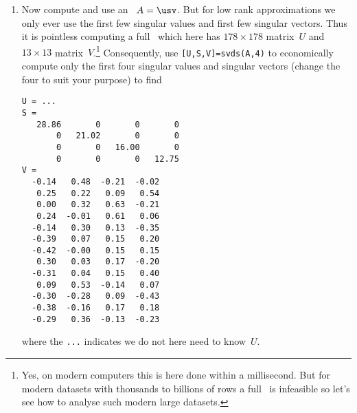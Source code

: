 \begin{example}
\begin{solution}
\begin{enumerate}
But now a further issue arises: the values in the columns are of widely different magnitudes; moreover, each column has different physical units (in contrast, the Iris flower measurements were all cm).
In practice we \emph{must not} mix together quantities with different physical units. 
The general rule, after making each column zero mean, is to scale each column by dividing by its ,  equivalently by its root-mean-square.
This scaling does two practically useful things: 
\begin{itemize}
\item since the standard deviation measures the spread of data in a column, it has the same physical units as the column of data, so dividing by it renders the results dimensionless, and so suitable for mixing with other scaled columns;
\item also the spread of data in each column is now comparable to each other, namely around about size one, instead of some columns being of the order of one-tenths and other columns being in the hundreds.
\end{itemize}
Consequently, form the \(178\times13\) matrix to analyse by commands
\begin{verbatim}
meanw=mean(wine(:,2:14))
stdw=std(wine(:,2:14))
A=(wine(:,2:14)-ones(m,1)*meanw)*diag(1./stdw);
\end{verbatim}
where the \verb|std(X)| computes the  of each column of~\verb|X|.

\item Now compute and use an \svd\ \(A=\usv\).
But for low rank approximations we only ever use the first few singular values and first few singular vectors.
Thus it is pointless computing a full \svd\ which here has \(178\times178\) matrix~\(U\) and \(13\times13\) matrix~\(V\).\footnote{Yes, on modern computers this is here done within a millisecond.  But for modern datasets with thousands to billions of rows a full \svd\ is infeasible so let's see how to analyse such modern large datasets.}
Consequently, use \verb|[U,S,V]=svds(A,4)| to economically compute only the first four singular values and singular vectors (change the four to suit your purpose) to find \twodp
\begin{verbatim}
U = ...
S =
   28.86       0       0       0
       0   21.02       0       0
       0       0   16.00       0
       0       0       0   12.75
V =
  -0.14   0.48  -0.21  -0.02
   0.25   0.22   0.09   0.54
   0.00   0.32   0.63  -0.21
   0.24  -0.01   0.61   0.06
  -0.14   0.30   0.13  -0.35
  -0.39   0.07   0.15   0.20
  -0.42  -0.00   0.15   0.15
   0.30   0.03   0.17  -0.20
  -0.31   0.04   0.15   0.40
   0.09   0.53  -0.14   0.07
  -0.30  -0.28   0.09  -0.43
  -0.38  -0.16   0.17   0.18
  -0.29   0.36  -0.13  -0.23
\end{verbatim}
where the \verb|...| indicates we do not here need to know~\(U\).


\end{enumerate}
\end{solution}
\end{example}
